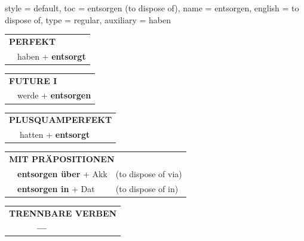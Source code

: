 \begin{verbentry}{
  style = {default},
  toc = {entsorgen (to dispose of)},
  name = {entsorgen},
  english = {to dispose of},
  type = {regular},
  auxiliary = {haben}
}
 \begin{tabular}{rl}
     \multicolumn{2}{l}{\textbf{PERFEKT}}\\
   & haben + \textbf{entsorgt}\\
  \end{tabular}
\hfill
   \begin{tabular}{rl}
    \multicolumn{2}{l}{\textbf{FUTURE I} }\\
   & werde + \textbf{entsorgen}\\
  \end{tabular}
\hfill
   \begin{tabular}{rl}
      \multicolumn{2}{l}{\textbf{PLUSQUAMPERFEKT}}\\
   & hatten + \textbf{entsorgt}\\
  \end{tabular}

   \vspace{10pt}

   \begin{tabular}{lll}
      \multicolumn{3}{l}{\textbf{MIT PRÄPOSITIONEN}}\\
& \textbf{entsorgen über} + Akk & (to dispose of via)\\
& \textbf{entsorgen in} + Dat & (to dispose of in)\\
\end{tabular}
  \hfill
   \begin{tabular}{lll}
\multicolumn{3}{l}{\textbf{TRENNBARE VERBEN}}\\
& \textbf{---} & \\
\end{tabular}

  \vspace{-5pt}
\end{verbentry}

